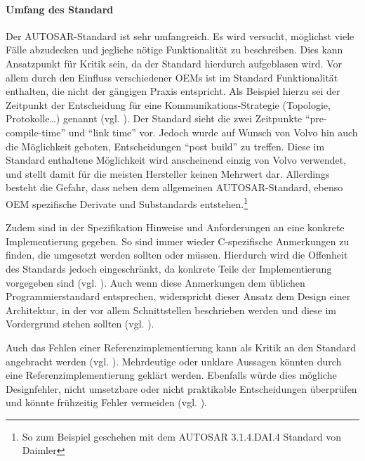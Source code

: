 \documentclass[
  a4paper,					    %
  twoside,
  DIV=calc,     				%
  bibliography=totoc,
  cleardoublepage=empty,
  ngerman,     					%
  final       					%
]{scrbook}
\begin{document}
\paragraph{Umfang des Standard}
Der AUTOSAR-Standard ist sehr umfangreich. Es wird versucht, möglichst viele Fälle abzudecken und jegliche nötige Funktionalität zu beschreiben. Dies kann Ansatzpunkt für Kritik sein, da der Standard hierdurch aufgeblasen wird. Vor allem durch den Einfluss verschiedener OEMs ist im Standard Funktionalität enthalten, die nicht der gängigen Praxis entspricht. Als Beispiel hierzu sei der Zeitpunkt der Entscheidung für eine Kommunikations-Strategie (Topologie, Protokolle\dots) genannt (vgl. \cite{as_kritik}). Der Standard sieht die zwei Zeitpunkte "`pre-compile-time"' und "`link time"' vor. Jedoch wurde auf Wunsch von Volvo hin auch die Möglichkeit geboten, Entscheidungen "`post build"' zu treffen. Diese im Standard enthaltene Möglichkeit wird anscheinend einzig von Volvo verwendet, und stellt damit für die meisten Hersteller keinen Mehrwert dar. Allerdings besteht die Gefahr, dass neben dem allgemeinen AUTOSAR-Standard, ebenso OEM spezifische Derivate und Substandards entstehen.\footnote{So zum Beispiel geschehen mit dem AUTOSAR 3.1.4.DAI.4 Standard von Daimler}

Zudem sind in der Spezifikation Hinweise und Anforderungen an eine konkrete Implementierung gegeben. So sind immer wieder C-spezifische Anmerkungen zu finden, die umgesetzt werden sollten oder müssen. Hierdurch wird die Offenheit des Standards jedoch eingeschränkt, da konkrete Teile der Implementierung vorgegeben sind (vgl. \cite[Seite 20]{autosar_eth}). Auch wenn diese Anmerkungen dem üblichen Programmierstandard entsprechen, widerspricht dieser Ansatz dem Design einer Architektur, in der vor allem Schnittstellen beschrieben werden und diese im Vordergrund stehen sollten (vgl. \cite{objektorientierung}).

Auch das Fehlen einer Referenzimplementierung kann als Kritik an den Standard angebracht werden (vgl. \cite{Hoffmann200803}). Mehrdeutige oder unklare Aussagen könnten durch eine Referenzimplementierung geklärt werden. Ebenfalls würde dies mögliche Designfehler, nicht umsetzbare oder nicht praktikable Entscheidungen überprüfen und könnte frühzeitig Fehler vermeiden (vgl. \cite{testing}).
\end{document}
